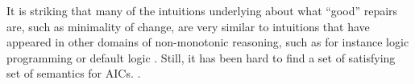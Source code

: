 
It is striking that many of the intuitions underlying about what ``good'' repairs are, such as minimality of change, are very similar to intuitions that have appeared in other domains of non-monotonic reasoning, such as for instance logic programming  or default logic . 
Still, it has been hard to find a set of satisfying set of semantics for AICs.
. 



